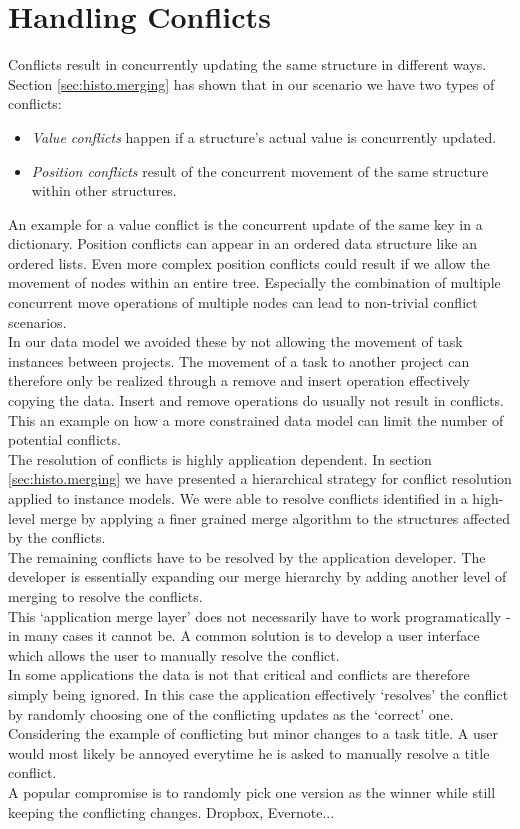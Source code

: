 
\section{Handling Conflicts}

Conflicts result in concurrently updating the same structure in different ways.
Section \ref{sec:histo.merging} has shown that in our scenario we have two types of conflicts:

\begin{itemize}
\item \emph{Value conflicts} happen if a structure's actual value is concurrently updated.
\item \emph{Position conflicts} result of the concurrent movement of the same structure within other structures.
\end{itemize}

An example for a value conflict is the concurrent update of the same key in a dictionary.
Position conflicts can appear in an ordered data structure like an ordered lists.
Even more complex position conflicts could result if we allow the movement of nodes within an entire tree.
Especially the combination of multiple concurrent move operations of multiple nodes can lead to non-trivial conflict scenarios.\\
In our data model we avoided these by not allowing the movement of task instances between projects.
The movement of a task to another project can therefore only be realized through a remove and insert operation effectively copying the data.
Insert and remove operations do usually not result in conflicts.
This an example on how a more constrained data model can limit the number of potential conflicts.\\
The resolution of conflicts is highly application dependent.
In section \ref{sec:histo.merging} we have presented a hierarchical strategy for conflict resolution applied to instance models.
We were able to resolve conflicts identified in a high-level merge by applying a finer grained merge algorithm to the structures affected by the conflicts.\\
The remaining conflicts have to be resolved by the application developer.
The developer is essentially expanding our merge hierarchy by adding another level of merging to resolve the conflicts.\\
This `application merge layer' does not necessarily have to work programatically - in many cases it cannot be.
A common solution is to develop a user interface which allows the user to manually resolve the conflict.\\
In some applications the data is not that critical and conflicts are therefore simply being ignored.
In this case the application effectively `resolves' the conflict by randomly choosing one of the conflicting updates as the `correct' one.\\
Considering the example of conflicting but minor changes to a task title.
A user would most likely be annoyed everytime he is asked to manually resolve a title conflict.\\
A popular compromise is to randomly pick one version as the winner while still keeping the conflicting changes.
Dropbox, Evernote...

